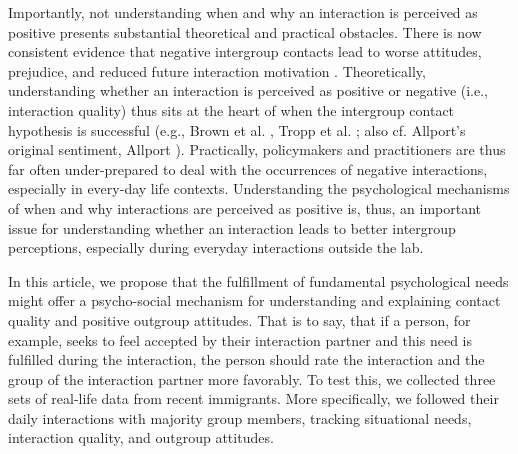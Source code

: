 \documentclass[man, 12pt, a4paper]{apa7}
\theoremstyle{break}
\theoremstyle{plain}
\begin{document}
Importantly, not understanding when and why an interaction is perceived as positive presents substantial theoretical and practical obstacles. There is now consistent evidence that negative intergroup contacts lead to worse attitudes, prejudice, and reduced future interaction motivation \citep[e.g.,][]{Barlow2012, Prati2021, Graf2014}. Theoretically, understanding whether an interaction is perceived as positive or negative (i.e., interaction quality) thus sits at the heart of when the intergroup contact hypothesis is successful (e.g., Brown et al. \citeyear{Brown2007}, Tropp et al. \citeyear{Tropp2016}; also cf. Allport’s original sentiment, Allport \citeyear{Allport1954b}). Practically, policymakers and practitioners are thus far often under-prepared to deal with the occurrences of negative interactions, especially in every-day life contexts. Understanding the psychological mechanisms of when and why interactions are perceived as positive is, thus, an important issue for understanding whether an interaction leads to better intergroup perceptions, especially during everyday interactions outside the lab.

In this article, we propose that the fulfillment of fundamental psychological needs might offer a psycho-social mechanism for understanding and explaining contact quality and positive outgroup attitudes. That is to say, that if a person, for example, seeks to feel accepted by their interaction partner and this need is fulfilled during the interaction, the person should rate the interaction and the group of the interaction partner more favorably. To test this, we collected three sets of real-life data from recent immigrants. More specifically, we followed their daily interactions with majority group members, tracking situational needs, interaction quality, and outgroup attitudes. 
\end{document}
